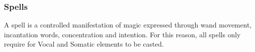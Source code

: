 \pagebreak
\subsubsection{Spells}
A spell is a controlled manifestation of magic expressed through wand movement, incantation words, concentration and intention. For this reason, all spells only require for Vocal and Somatic elements to be casted. \\












